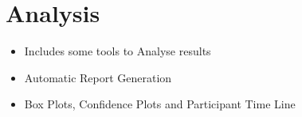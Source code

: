 \vspace{-0.8cm}

{\color{emphasisered} \section{Analysis}}


\normalsize

\begin{itemize}%
	\item Includes some tools to Analyse results
	\item Automatic Report Generation
	\item Box Plots, Confidence Plots and Participant Time Line
\end{itemize}
\vspace{-0.3cm}


\vspace{-0.3cm}
